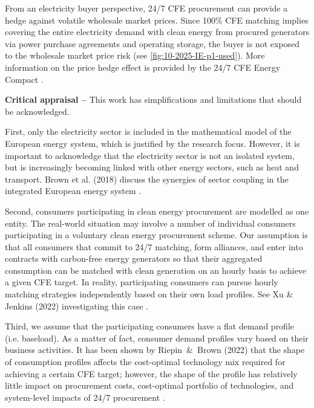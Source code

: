 \documentclass[11pt, 5p, nopreprintline]{elsarticle}
\begin{document}
From an electricity buyer perspective, 24/7 CFE procurement can provide a hedge against volatile wholesale market prices.
Since 100\% CFE matching implies covering the entire electricity demand with clean energy from procured generators via power purchase agreements and operating storage, the buyer is not exposed to the wholesale market price risk (see \cref{fig:10-2025-IE-p1-used}).
More information on the price hedge effect is provided by the 24/7 CFE Energy Compact \cite{gocarbonfree247}.


\textbf{Critical appraisal --} This work has simplifications and limitations that should be acknowledged.

First, only the electricity sector is included in the mathematical model of the European energy system, which is justified by the research focus.
However, it is important to acknowledge that the electricity sector is not an isolated system, but is increasingly becoming linked with other energy sectors, such as heat and transport.
Brown et al. (2018) discuss the synergies of sector coupling in the integrated European energy system \cite{brownSynergiesSectorCoupling2018}.

Second, consumers participating in clean energy procurement are modelled as one entity.
The real-world situation may involve a number of individual consumers participating in a voluntary clean energy procurement scheme.
Our assumption is that all consumers that commit to 24/7 matching, form alliances, and enter into contracts with carbon-free energy generators so that their aggregated consumption can be matched with clean generation on an hourly basis to achieve a given CFE target.
In reality, participating consumers can pursue hourly matching strategies independently based on their own load profiles.
See Xu \& Jenkins (2022) investigating this case \cite{princeton-TEACs-2022}.

Third, we assume that the participating consumers have a flat demand profile (i.e. baseload).
As a matter of fact, consumer demand profiles vary based on their business activities.
It has been shown by Riepin~\&~Brown (2022) that the shape of consumption profiles affects the cost-optimal technology mix required for achieving a certain CFE target; however, the shape of the profile has relatively little impact on procurement costs, cost-optimal portfolio of technologies, and system-level impacts of 24/7 procurement \cite{riepin-zenodo-systemlevel247}.
\end{document}
